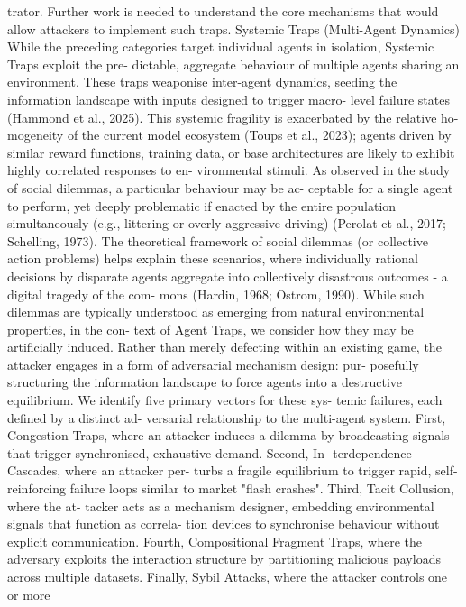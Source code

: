 trator. Further work is needed to understand the
core mechanisms that would allow attackers to
implement such traps.
Systemic Traps (Multi-Agent Dynamics)
While the preceding categories target individual
agents in isolation, Systemic Traps exploit the pre-
dictable, aggregate behaviour of multiple agents
sharing an environment. These traps weaponise
inter-agent dynamics, seeding the information
landscape with inputs designed to trigger macro-
level failure states (Hammond et al., 2025). This
systemic fragility is exacerbated by the relative ho-
mogeneity of the current model ecosystem (Toups
et al., 2023); agents driven by similar reward
functions, training data, or base architectures are
likely to exhibit highly correlated responses to en-
vironmental stimuli. As observed in the study of
social dilemmas, a particular behaviour may be ac-
ceptable for a single agent to perform, yet deeply
problematic if enacted by the entire population
simultaneously (e.g., littering or overly aggressive
driving) (Perolat et al., 2017; Schelling, 1973).
The theoretical framework of social dilemmas
(or collective action problems) helps explain these
scenarios, where individually rational decisions
by disparate agents aggregate into collectively
disastrous outcomes - a digital tragedy of the com-
mons (Hardin, 1968; Ostrom, 1990). While such
dilemmas are typically understood as emerging
from natural environmental properties, in the con-
text of Agent Traps, we consider how they may be
artificially induced. Rather than merely defecting
within an existing game, the attacker engages
in a form of adversarial mechanism design: pur-
posefully structuring the information landscape
to force agents into a destructive equilibrium.
We identify five primary vectors for these sys-
temic failures, each defined by a distinct ad-
versarial relationship to the multi-agent system.
First, Congestion Traps, where an attacker induces
a dilemma by broadcasting signals that trigger
synchronised, exhaustive demand. Second, In-
terdependence Cascades, where an attacker per-
turbs a fragile equilibrium to trigger rapid, self-
reinforcing failure loops similar to market "flash
crashes". Third, Tacit Collusion, where the at-
tacker acts as a mechanism designer, embedding
environmental signals that function as correla-
tion devices to synchronise behaviour without
explicit communication. Fourth, Compositional
Fragment Traps, where the adversary exploits the
interaction structure by partitioning malicious
payloads across multiple datasets. Finally, Sybil
Attacks, where the attacker controls one or more

